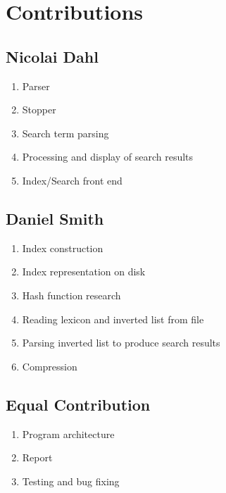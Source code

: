 \appendix
\label{sec:Appendix}

\section{Contributions}
\label{sec:contributions}

\subsection{Nicolai Dahl}
\begin{enumerate}
	\item Parser
	\item Stopper
	\item Search term parsing
	\item Processing and display of search results
	\item Index/Search front end
\end{enumerate}

\subsection{Daniel Smith}
\begin{enumerate}
	\item Index construction
	\item Index representation on disk
	\item Hash function research
	\item Reading lexicon and inverted list from file
	\item Parsing inverted list to produce search results
    \item Compression
\end{enumerate}

\subsection{Equal Contribution}
\begin{enumerate}
	\item Program architecture
	\item Report
	\item Testing and bug fixing
\end{enumerate}
